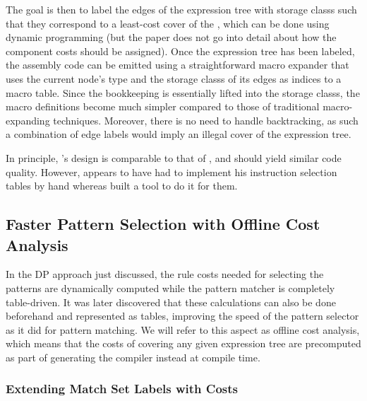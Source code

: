 {The goal is then to label the \glspl{edge} of the \gls{expression tree} with
\glspl{storage class} such that they correspond to a least-cost cover of the
, which can be done using dynamic programming (but the
paper does not go into detail about how the component costs should be
assigned).
%
Once the \gls{expression tree} has been labeled, the \gls{assembly code}
can be emitted using a straightforward \gls{macro expander} that uses the
current \gls{node}'s type and the \glspl{storage class} of its \glspl{edge} as
indices to a macro table.
%
Since the bookkeeping is essentially lifted into the
\glspl{storage class}, the macro definitions become much simpler compared to
those of traditional \gls{macro}-expanding techniques.
%
Moreover, there is no
need to handle backtracking, as such a combination of \gls{edge} labels would
imply an illegal cover of the \gls{expression tree}.

In principle, \citeauthor{Horspool1987}'s design is comparable to that of
\citeauthor{Aho1989}, and should yield similar code quality.
%
However,
\citeauthor{Horspool1987} appears to have had to implement his \gls{instruction
selection} tables by hand whereas \citeauthor{Aho1989} built a tool to do it for
them.


\subsection{Faster Pattern Selection with Offline Cost Analysis}

In the \gls{DP} approach just discussed, the \gls{rule} costs needed for selecting
the \glspl{pattern} are dynamically computed while the \gls{pattern matcher} is
completely table-driven.
%
It was later discovered that these calculations can
also be done beforehand and represented as tables, improving the speed of the
\gls{pattern selector} as it did for \gls{pattern matching}.
%
We will refer to
this aspect as \gls{offline cost analysis}, which means that the costs of
covering any given \gls{expression tree} are precomputed as part of generating the
\gls{compiler} instead at compile time.


\subsubsection{Extending Match Set Labels with Costs}

}
